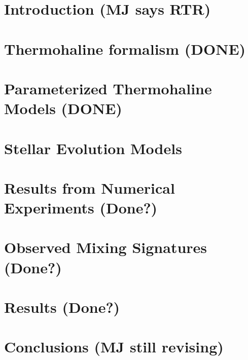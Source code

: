 \documentclass[linenumbers,twocolumn]{aastex62}
\begin{document}

\section{Introduction \textbf{(MJ says RTR)} }
\label{sec:intro}
\setcounter{footnote}{0}


\section{Thermohaline formalism \textbf{(DONE)}}
\label{sec:formalism}


\section{Parameterized Thermohaline Models \textbf{(DONE)}}
\label{sec:parameterizations}


\section{Stellar Evolution Models} %
\label{sec:mesa_experiment}


\section{Results from Numerical Experiments \textbf{(Done?)}}
\label{sec:mesa_results}


\section{Observed Mixing Signatures \bf({Done?})}
\label{sec:obs}


\section{Results \bf{(Done?)}} 
\label{sec:punchline}


\section{Conclusions \textbf{(MJ still revising)}}
\label{sec:conclusions}

\end{document}
